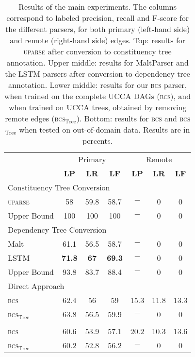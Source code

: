 \documentclass[11pt]{article}
\begin{document}
\begin{table}[ht]
  \small
\begin{tabular}{l|ccc|ccc}
& \multicolumn{3}{c|}{Primary} & \multicolumn{3}{c}{Remote} \\
& \textbf{LP} & \textbf{LR} & \textbf{LF} & \textbf{LP} & \textbf{LR} & \textbf{LF} \\
\hline
\multicolumn{4}{l}{\rule{0pt}{4ex} \footnotesize Constituency Tree Conversion} \\
\textsc{uparse} & 58 & 59.8 & 58.7 & $-$ & 0 & 0 \\
Upper Bound & 100 & 100 & 100 & $-$ & 0 & 0 \\
\hline
\multicolumn{4}{l}{\rule{0pt}{4ex} \footnotesize Dependency Tree Conversion} \\
Malt & 61.1 & 56.5 & 58.7 & $-$ & 0 & 0 \\
LSTM & {\bf 71.8} & {\bf 67} & {\bf 69.3} & $-$ & 0 & 0 \\
Upper Bound & 93.8 & 83.7 & 88.4 & $-$ & 0 & 0 \\
\hline
\multicolumn{4}{l}{\rule{0pt}{4ex} \footnotesize Direct Approach} \\
\textsc{bcs} & 62.4 & 56 & 59 & 15.3 & 11.8 & 13.3 \\
\textsc{bcs}$_{\mathrm{Tree}}$ & 63.8 & 56.5 & 59.9 & $-$ & 0 & 0 \\
\hhline{=======}
\multicolumn{4}{l}{\rule{0pt}{4ex} \footnotesize Out-of-domain} \\
\textsc{bcs} & 60.6 & 53.9 & 57.1 & 20.2 & 10.3 & 13.6 \\
\textsc{bcs}$_{\mathrm{Tree}}$ & 60.2 & 52.8 & 56.2 & $-$ & 0 & 0 \\
\end{tabular}
\caption{\small
  Results of the main experiments. The columns correspond to labeled precision,
  recall and F-score for the different parsers, for both primary (left-hand side)
  and remote (right-hand side) edges. Top: results for \textsc{uparse}
  after conversion to constituency tree annotation. Upper middle: results for
  MaltParser and the LSTM parsers after conversion to dependency tree annotation.
  Lower middle: results for our \textsc{bcs} parser, when trained on the complete UCCA DAGs (\textsc{bcs}),
  and when trained on UCCA trees, obtained by removing remote edges (\textsc{bcs}$_{\mathrm{Tree}}$).
  Bottom: results for \textsc{bcs} and \textsc{bcs}$_{\mathrm{Tree}}$ when tested on out-of-domain data.
  Results are in percents.
}

\label{table:convert}
\end{table}
\end{document}
